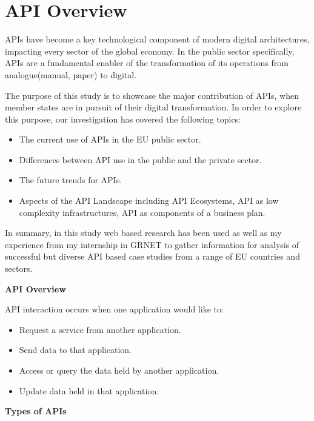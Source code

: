 \section{API Overview} %


APIs have become a key technological component of modern digital
architectures, impacting every sector of the global economy. In the public
sector specifically, APIs are a fundamental enabler of the transformation of its
operations from analogue(manual, paper) to digital.

The purpose of this study is to showcase the 
major contribution of APIs, when member states are in
pursuit of their digital transformation.
In order to explore this purpose, our investigation has
covered the following topics:

\begin{itemize}
	\item The current use of APIs in the EU public sector.
	\item Differences between API use in the public and the private sector.
	\item The future trends for APIs.
	\item Aspects of the API Landscape including API Ecosystems, API as low complexity infrastructures,
	API as components of a business plan.
\end{itemize}
                                                                       
In summary, in this study web based research has been used as well as my
experience from my internship in GRNET to gather information for analysis
of successful but diverse API based case studies from a range of EU countries
and sectors.

\textbf{API Overview}

API interaction occurs when one application would like to:
\begin{itemize}
	\item Request a service from another application.
	\item Send data to that application.
	\item Access or query the data held by another application.
	\item Update data held in that application.

\end{itemize}

\textbf{Types of APIs}

